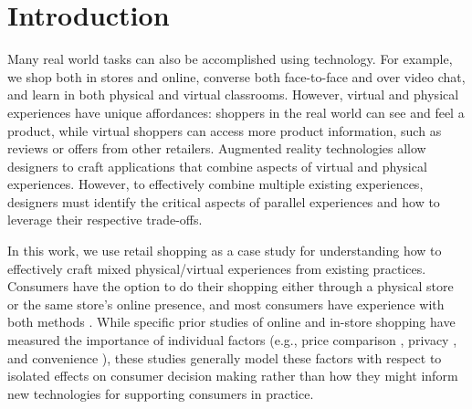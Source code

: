 \section{Introduction}

Many real world tasks can also be accomplished using technology.  For example, we shop both in stores and online, converse both face-to-face and over video chat, and learn in both physical and virtual classrooms. However, virtual and physical experiences have unique affordances: shoppers in the real world can see and feel a product, while virtual shoppers can access more product information, such as reviews or offers from other retailers. Augmented reality technologies allow designers to craft applications that combine aspects of virtual and physical experiences. However, to effectively combine multiple existing experiences, designers must identify the critical aspects of parallel experiences and how to leverage their respective trade-offs.

In this work, we use retail shopping as a case study for understanding how to effectively craft mixed physical/virtual experiences from existing practices. Consumers have the option to do their shopping either through a physical store or the same store's online presence, and most consumers have experience with both methods \cite{nyt}. While specific prior studies of online and in-store shopping have measured the importance of individual factors (e.g., price comparison \cite{karlsson2005price}, privacy \cite{miyazaki2001consumer}, and convenience \cite{bednarz2010perceptions}), these studies generally model these factors with respect to isolated effects on consumer decision making rather than how they might inform new technologies for supporting consumers in practice. 

